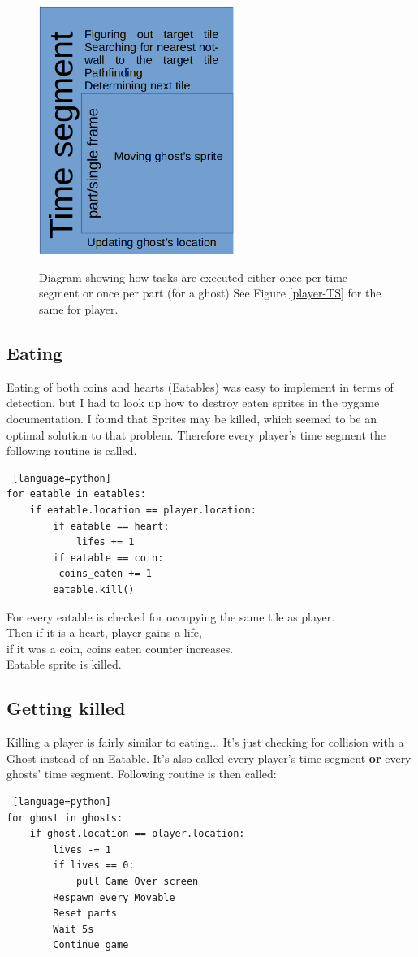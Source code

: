 \documentclass[11pt,a4paper]{report}
\newcommand{\dsubsection}[1]{\FloatBarrier \subsection{#1}}
\newenvironment{img}{
	\begin{center}
		\begin{figure}[H]
			\begin{center}
			
}{
	\end{center}
		\end{figure}
			\end{center}
}
\begin{document}
			\begin{img}
				\includegraphics[width=180pt]{images/ghost-time-segment}\\
				\caption{Diagram showing how tasks are executed either once per time segment or once per part (for a ghost) \newline See Figure \ref{player-TS} for the same for player.}
			\end{img}
			\dsubsection{Eating}
				Eating of both coins and hearts (Eatables) was easy to implement in terms of detection, but I had to look up how to destroy eaten sprites in the pygame documentation. I found that Sprites may be killed, which seemed to be an optimal solution to that problem. Therefore every player's time segment the following routine is called.
				\begin{lstlisting} [language=python]
for eatable in eatables:
	if eatable.location == player.location:
		if eatable == heart:
			lifes += 1
		if eatable == coin:
		 coins_eaten += 1
		eatable.kill()
				\end{lstlisting}
				For every eatable is checked for occupying the same tile as player.\\
				Then if it is a heart, player gains a life,\\
				if it was a coin, coins eaten counter increases.\\
				Eatable sprite is killed.
			\dsubsection{Getting killed}
				Killing a player is fairly similar to eating... It's just checking for collision with a Ghost instead of an Eatable. It's also called every player's time segment \textbf{or} every ghosts' time segment.
				Following routine is then called:
				\begin{lstlisting} [language=python]
for ghost in ghosts:
	if ghost.location == player.location:
		lives -= 1
		if lives == 0:
			pull Game Over screen
		Respawn every Movable
		Reset parts
		Wait 5s
		Continue game
				\end{lstlisting}
\end{document}

